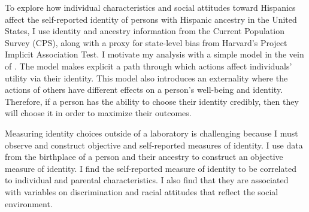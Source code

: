 \documentclass[12pt, fullpage]{article}
\begin{document}
To explore how individual characteristics and social attitudes toward Hispanics affect the self-reported identity of persons with Hispanic ancestry in the United States, I use identity and ancestry information from the Current Population Survey (CPS), along with a proxy for state-level bias from Harvard's Project Implicit Association Test. I motivate my analysis with a simple model in the vein of \citet{akerlofEconomicsIdentity2000}. The model makes explicit a path through which actions affect individuals' utility via their identity. This model also introduces an externality where the actions of others have different effects on a person's well-being and identity. Therefore, if a person has the ability to choose their identity credibly, then they will choose it in order to maximize their outcomes.

Measuring identity choices outside of a laboratory is challenging because I must observe and construct objective and self-reported measures of identity. I use data from the birthplace of a person and their ancestry to construct an objective measure of identity. I find the self-reported measure of identity to be correlated to individual and parental characteristics. I also find that they are associated with variables on discrimination and racial attitudes that reflect the social environment. 
\end{document}
